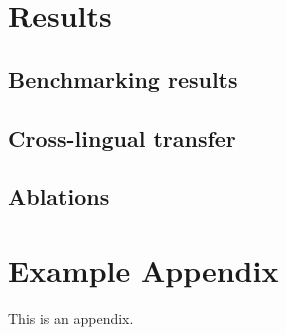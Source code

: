 \documentclass[11pt]{article}
\begin{document}
\section{Results}


\subsection{Benchmarking results}


\subsection{Cross-lingual transfer}


\subsection{Ablations}


\subsection{}




\appendix

\section{Example Appendix}
\label{sec:appendix}

This is an appendix.
\end{document}
